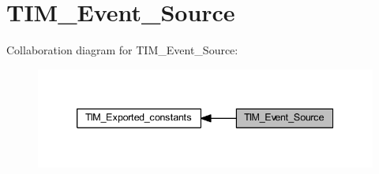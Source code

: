 \hypertarget{group___t_i_m___event___source}{}\section{T\+I\+M\+\_\+\+Event\+\_\+\+Source}
\label{group___t_i_m___event___source}
Collaboration diagram for T\+I\+M\+\_\+\+Event\+\_\+\+Source\+:
\nopagebreak
\begin{figure}[H]
\begin{center}
\leavevmode
\includegraphics[width=339pt]{group___t_i_m___event___source}
\end{center}
\end{figure}
